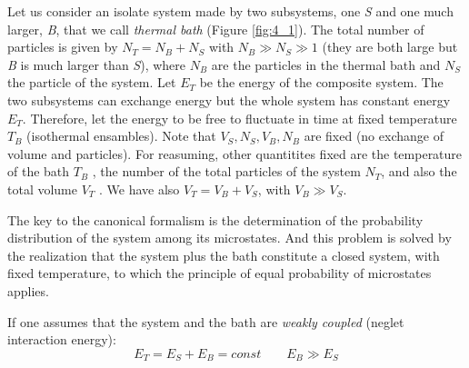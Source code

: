 \documentclass[../main/main.tex]{subfiles}
\begin{document}
Let us consider an isolate system made by two subsystems, one \emph{S} and one much larger, \emph{B}, that we call \emph{thermal bath} (Figure \ref{fig:4_1}). The total number of particles is given by \( N_T = N_B + N_S\)  with \( N_B \gg N_S \gg 1 \) (they are both large but \emph{B} is much larger than \emph{S}), where \( N_B \) are the particles in the thermal bath and \( N_S \) the particle of the system.
Let \( E_T \) be the energy of the composite system. The two subsystems can exchange energy but the whole system has constant energy  \( E_T \). Therefore, let the energy to be free to fluctuate in time at fixed temperature  \( T_B \) (isothermal ensambles).
Note that \( V_S,N_S,V_B,N_B \) are fixed (no exchange of volume and particles). For reasuming, other quantitites fixed are the temperature of the bath \( T_B \) , the number of the total particles of the system \( N_T \), and also the total volume \( V_T \) .
 We have also \( V_T = V_B + V_S \), with   \( V_B \gg V_S \).

The key to the canonical formalism is the determination of the probability distribution of the system among its microstates. And this problem is solved by the realization that the system plus the bath constitute a closed system, with fixed temperature, to which the principle of equal probability of microstates applies.

If one assumes that the system and the bath are \emph{weakly coupled} (neglet interaction energy):
\begin{equation*}
  E_T = E_S + E_B = const \qquad E_B \gg E_S
\end{equation*}
\end{document}
